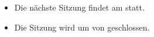 \documentclass[
appendixprefix=true,
a4paper,                    %
11pt,                       %
oneside,                    %
parskip=half-,              %
]{scrartcl}
\begin{document}
  \makeTitle
  \makePreamble
  \tableofcontents

  \makeAttendance
	\newpage
  
  

  

  \begin{itemize}
    \item {Die nächste Sitzung findet am \textbf{\meetingNext} statt.}
    \item {Die Sitzung wird um \textbf{\meetingEndTime} von \textbf{\chair} geschlossen.}
  \end{itemize}
  \makePostamble
\end{document}
